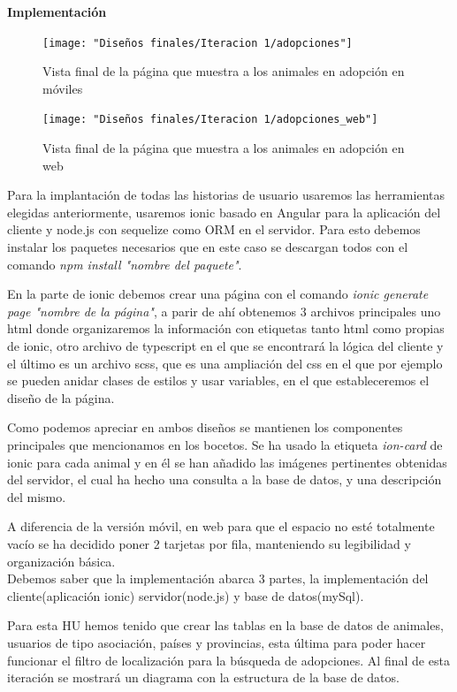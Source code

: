 \textbf{Implementación} %

\begin{figure}[H]
	\centering
	\texttt{[image: "Diseños finales/Iteracion 1/adopciones"]}
	\caption{Vista final de la página que muestra a los animales en adopción en móviles}
	\label{fig:adopcionesDef}
\end{figure}


\begin{figure}[H]
	\centering
	\texttt{[image: "Diseños finales/Iteracion 1/adopciones\_web"]}
	\caption{Vista final de la página que muestra a los animales en adopción en web}
	\label{fig:adopcionesDefWeb}
\end{figure}
Para la implantación de todas las historias de usuario usaremos las herramientas elegidas anteriormente, usaremos ionic basado en Angular para la aplicación del cliente y node.js con sequelize como ORM en el servidor. Para esto debemos instalar los paquetes necesarios que en este caso se descargan todos con el comando \textit{npm install "nombre del paquete"}.

En la parte de ionic debemos crear una página con el comando \textit{ionic generate page "nombre de la página"}, a parir de ahí obtenemos 3 archivos principales uno html donde organizaremos la información con etiquetas tanto html como propias de ionic, otro archivo de typescript en el que se encontrará la lógica del cliente y el último es un archivo scss, que es una ampliación del css en el que por ejemplo se pueden anidar clases de estilos y usar variables, en el que estableceremos el diseño de la página.

Como podemos apreciar en ambos diseños se mantienen los componentes principales que mencionamos en los bocetos. Se ha usado la etiqueta \textit{ion-card} de ionic para cada animal y en él se han añadido las imágenes pertinentes obtenidas del servidor, el cual ha hecho una consulta a la base de datos, y una descripción del mismo.

A diferencia de la versión móvil, en web para que el espacio no esté totalmente vacío se ha decidido poner 2 tarjetas por fila, manteniendo su legibilidad y organización básica. \\

Debemos saber que la implementación abarca 3 partes, la implementación del cliente(aplicación ionic) servidor(node.js) y base de datos(mySql).

Para esta HU hemos tenido que crear las tablas en la base de datos de animales, usuarios de tipo asociación, países y provincias, esta última para poder hacer funcionar el filtro de localización para la búsqueda de adopciones. Al final de esta iteración se mostrará un diagrama con la estructura de la base de datos.\\

